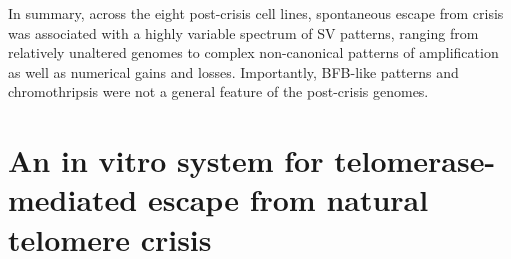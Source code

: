 \documentclass[phd,tocprelim]{cornell}
\renewcommand{\caption}[1]{\singlespacing\hangcaption{#1}\normalspacing}
\begin{document}
In summary, across the eight post-crisis cell lines, spontaneous escape from crisis was associated with a highly variable spectrum of SV patterns, ranging from relatively unaltered genomes to complex non-canonical patterns of amplification as well as numerical gains and losses. Importantly, BFB-like patterns and chromothripsis were not a general feature of the post-crisis genomes.

\section{An in vitro system for telomerase-mediated escape from natural telomere crisis}




\end{document}
